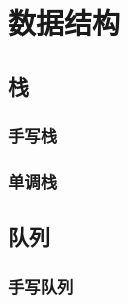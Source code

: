 \chapter{数据结构}\label{ch:data-structure}

\section{栈}\label{sec:stack}

\subsection{手写栈}\label{subsec:handwriting-stack}


\subsection{单调栈}\label{subsec:monotonic-stack}


\section{队列}\label{sec:queue}

\subsection{手写队列}\label{subsec:handwriting-queue}

